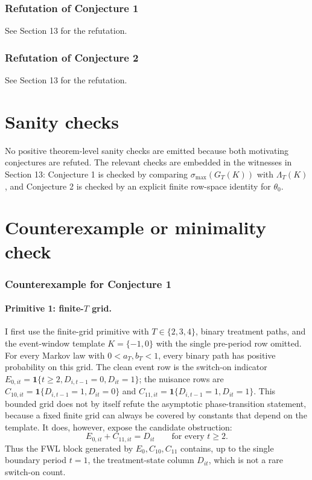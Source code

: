 \documentclass[11pt]{article}
\newcommand{\one}{\mathbf{1}}
\theoremstyle{definition}
\theoremstyle{plain}
\theoremstyle{remark}
\begin{document}
\subsubsection*{Refutation of Conjecture 1}
See Section 13 for the refutation.

\subsubsection*{Refutation of Conjecture 2}
See Section 13 for the refutation.

\section{Sanity checks}
No positive theorem-level sanity checks are emitted because both motivating conjectures are refuted.
The relevant checks are embedded in the witnesses in Section 13: Conjecture 1 is checked by comparing \(\sigma_{\max}(G_T(K))\) with \(\Lambda_T(K)\), and Conjecture 2 is checked by an explicit finite row-space identity for \(\theta_0\).

\section{Counterexample or minimality check}
\subsubsection*{Counterexample for Conjecture 1}
\paragraph{Primitive 1: finite-\(T\) grid.}
I first use the finite-grid primitive with \(T\in\{2,3,4\}\), binary treatment paths, and the event-window template \(K=\{-1,0\}\) with the single pre-period row omitted.
For every Markov law with \(0<a_T,b_T<1\), every binary path has positive probability on this grid.
The clean event row is the switch-on indicator \(E_{0,it}=\one\{t\ge2,D_{i,t-1}=0,D_{it}=1\}\); the nuisance rows are \(C_{10,it}=\one\{D_{i,t-1}=1,D_{it}=0\}\) and \(C_{11,it}=\one\{D_{i,t-1}=1,D_{it}=1\}\).
This bounded grid does not by itself refute the asymptotic phase-transition statement, because a fixed finite grid can always be covered by constants that depend on the template.
It does, however, expose the candidate obstruction:
\[
E_{0,it}+C_{11,it}
=D_{it}\qquad\text{for every }t\ge2.
\]
Thus the FWL block generated by \(E_0,C_{10},C_{11}\) contains, up to the single boundary period \(t=1\), the treatment-state column \(D_{it}\), which is not a rare switch-on count.
\end{document}
